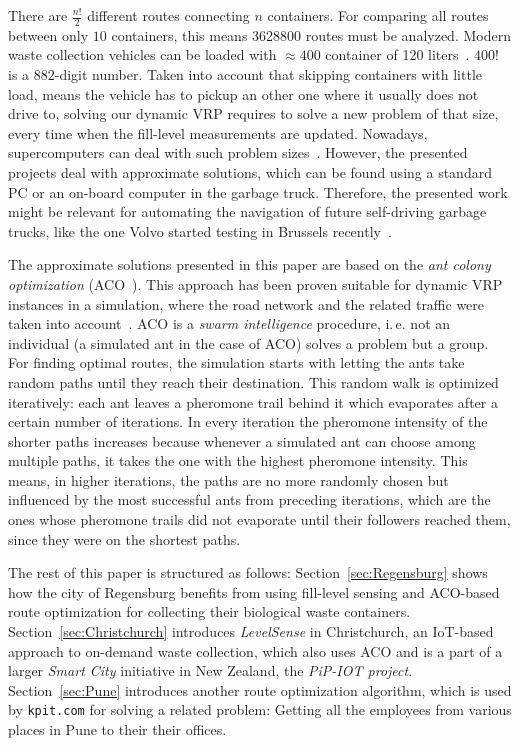 \documentclass[10pt]{article}
\begin{document}
There are $\frac{n!}{2}$ different routes connecting $n$ containers. 
For comparing all routes between only $10$ containers, this means 
3628800 routes must be analyzed. Modern waste collection
vehicles can be loaded with $\approx 400$ container of 120 
liters~\cite{hyundai18}.
$400!$ is a $882$-digit number. Taken into account that skipping 
containers with little load, means the vehicle has to pickup an other
one where it usually does not drive to, solving our dynamic VRP requires
to solve a new problem of that size, every time when the fill-level
measurements are updated. Nowadays, supercomputers can deal with 
such problem sizes~\cite{Burkhovetskiy2017}. However, the
presented projects deal with approximate solutions, which
can be found using a standard PC or an on-board computer in
the garbage truck. Therefore, the presented work might be relevant 
for automating the navigation of future self-driving garbage 
trucks, like the one Volvo started testing in Brussels 
recently~\cite{volvo17}.

The approximate solutions presented in this paper are based on 
the {\it ant colony optimization} (ACO~\cite{Dorigo04}). This 
approach has been proven suitable for dynamic VRP instances
in a simulation, where the road network and the related 
traffic were taken into account~\cite{Karadimas2008}. ACO is a {\it swarm intelligence}
procedure, i.\,e. not an individual (a simulated ant in the case of 
ACO) solves a problem but a group. For finding optimal routes,
the simulation starts with letting the ants take random paths
until they reach their destination. This random walk is optimized
iteratively: each ant leaves a pheromone trail behind it which
evaporates after a certain number of iterations. In every iteration
the pheromone intensity of the shorter paths increases because
whenever a simulated ant can choose among multiple paths, it takes
the one with the highest pheromone intensity. This means, in higher
iterations, the paths are no more randomly chosen but influenced 
by the most successful ants from preceding iterations, which are
the ones whose pheromone trails did not evaporate until their 
followers reached them, since they were on the shortest paths.

The rest of this paper is structured as follows: 
Section~\ref{sec:Regensburg} shows how the city of Regensburg benefits from using 
fill-level sensing and ACO-based route optimization for collecting their biological
waste containers. 
Section~\ref{sec:Christchurch} introduces {\it LevelSense} in Christchurch, 
an IoT-based approach to on-demand waste collection, which also uses ACO and is a 
part of a larger {\it Smart City} initiative in New Zealand, the {\it PiP-IOT project}. 
Section~\ref{sec:Pune} introduces another route optimization algorithm, which is used
by {\tt kpit.com} for solving a related problem: Getting all the employees
from various places in Pune to their their offices. 
\end{document}

